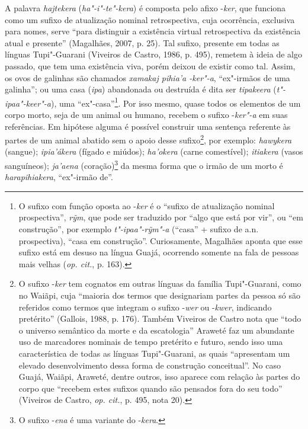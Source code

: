 A palavra \emph{hajtekera} (\emph{ha"-i"-te"-kera}) é composta pelo afixo
-\emph{ker}, que funciona como um sufixo de atualização nominal
retrospectiva, cuja ocorrência, exclusiva para nomes, serve ``para
distinguir a existência virtual retrospectiva da existência atual e
presente'' (Magalhães, 2007, p. 25). Tal sufixo, presente em todas as
línguas Tupi"-Guarani (Viveiros de Castro, 1986, p. 495), remetem à ideia
de algo passado, que tem uma existência viva, porém deixou de existir
como tal. Assim, os ovos de galinhas são chamados \emph{xamakaj pihia'a
-ker"-a}, ``ex"-irmãos de uma galinha''; ou uma casa (\emph{ipa}) abandonada
ou destruída é dita ser \emph{tipakeera} (\emph{t"-ipaa"-keer"-a}), uma
``ex"-casa''\footnote{O sufixo com função oposta ao -\emph{ker} é o ``sufixo
  de atualização nominal prospectiva'', \emph{rỹm}, que pode ser
  traduzido por ``algo que está por vir'', ou ``em construção'', por exemplo
  \emph{t"-ipaa"-rỹm"-a} (``casa'' + sufixo de a.n. prospectiva), ``casa em
      construção''. Curiosamente, Magalhães aponta que esse sufixo está em
  desuso na língua Guajá, ocorrendo somente na fala de pessoas mais
  velhas (\emph{op. cit.}, p. 163).}. Por isso mesmo, quase todos os elementos de
um corpo morto, seja de um animal ou humano, recebem o sufixo
-\emph{ker"-a} em suas referências. Em hipótese alguma é possível
construir uma sentença referente às partes de um animal abatido sem o
apoio desse sufixo\footnote{O sufixo -\emph{ker} tem cognatos em outras
  línguas da família Tupi"-Guarani, como no Waiãpi, cuja ``maioria dos
  termos que designariam partes da pessoa só são referidos como termos
  que integram o sufixo -\emph{wer} ou -\emph{kwer}, indicando pretérito''
  (Gallois, 1988, p. 176). Também Viveiros de Castro nota que ``todo o
      universo semântico da morte e da escatologia'' Araweté faz um abundante
  uso de marcadores nominais de tempo pretérito e futuro, sendo isso uma
  característica de todas as línguas Tupi"-Guarani, as quais ``apresentam
      um elevado desenvolvimento dessa forma de construção conceitual''. No
  caso Guajá, Waiãpi, Araweté, dentre outros, isso aparece com relação
  às partes do corpo que ``recebem estes sufixos quando são pensados fora
      do seu todo'' (Viveiros de Castro, \emph{op. cit.}, p. 495, nota 20).}, por
exemplo: \emph{hawykera} (sangue); \emph{ipia'ákera} (fígado e miúdos);
\emph{ha'okera} (carne comestível); \emph{itiakera} (vasos sanguíneos);
\emph{ja'aena} (coração)\footnote{O sufixo -\emph{ena} é uma variante do
  -\emph{kera}.} da mesma forma que o irmão de um morto é
\emph{harapihiakera}, ``ex"-irmão de''.

